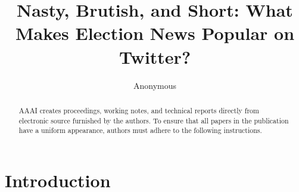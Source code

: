 \documentclass[letterpaper]{article}
\begin{document}
%
\title{Nasty, Brutish, and Short: 
What Makes Election News Popular on Twitter?}
\author{Anonymous\\
}
\maketitle
\begin{abstract}
AAAI creates proceedings, working notes, and technical reports directly from electronic source furnished by the authors. To ensure that all papers in the publication have a uniform appearance, authors must adhere to the following instructions. 
\end{abstract}

 
\section{Introduction}




 
\end{document}
